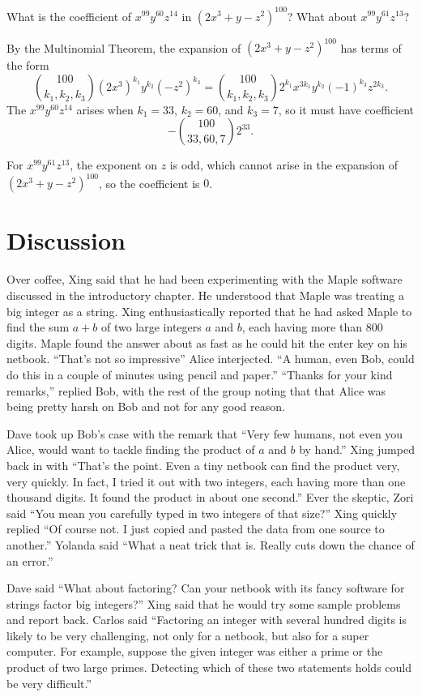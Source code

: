 \begin{example}
  What is the coefficient of $x^{99}y^{60}z^{14}$ in
  $(2x^3+y-z^2)^{100}$? What about $x^{99}y^{61}z^{13}$?

  By the Multinomial Theorem, the expansion of $(2x^3+y-z^2)^{100}$
  has terms of the form
  \[\binom{100}{k_1,k_2,k_3} (2x^3)^{k_1}y^{k_2}(-z^2)^{k_3} =
  \binom{100}{k_1,k_2,k_3} 2^{k_1}x^{3k_1}y^{k_2}(-1)^{k_3}z^{2k_3}.\]
  The $x^{99}y^{60}z^{14}$ arises when $k_1 = 33$, $k_2=60$, and
  $k_3=7$, so it must have coefficient
  \[-\binom{100}{33,60,7}2^{33}.\]

  For $x^{99}y^{61}z^{13}$, the exponent on $z$ is odd, which cannot
  arise in the expansion of $(2x^3+y-z^2)^{100}$, so the coefficient
  is $0$.
\end{example}

\section{Discussion}

Over coffee, Xing said that he had been experimenting with
the Maple software discussed in the introductory chapter.
He understood that Maple was treating a big integer as a string.
Xing enthusiastically reported that he had asked Maple to
find the sum $a+b$ of two large integers $a$ and $b$, each having more
than $800$ digits.  Maple found the answer about as fast as he
could hit the enter key on his netbook. 
``That's not so impressive'' Alice interjected.
``A human, even Bob, could do this in a couple of minutes using
pencil and paper.''  ``Thanks for your kind remarks,'' replied Bob,
with the rest of  the group noting that that Alice was being pretty
harsh on Bob and not for any good reason.

Dave took up Bob's case with the remark that ``Very few humans, not
even you Alice, would want to tackle finding the product of $a$ and
$b$ by hand.''  Xing jumped back in with ``That's the point.  Even
a tiny netbook can find the product very, very quickly.  In fact, I tried
it out with two integers, each having more than one thousand
digits.  It found the product in about one second.''  Ever the
skeptic, Zori said ``You mean you carefully typed in two
integers of that size?''  Xing quickly replied ``Of course not.  I
just copied and pasted the data from one source to another.''
Yolanda said ``What a neat trick that is.  Really cuts down the
chance of an error.''

Dave said ``What about factoring?  Can your netbook with its
fancy software for strings factor big integers?''  Xing
said that he would try some sample problems and report back.  
Carlos said  ``Factoring an integer with several hundred digits is
likely to be very challenging, not only for a netbook, but also for
a super computer.  For example, suppose the given integer was
either a prime or the product of two large primes.  Detecting
which of these two statements holds could be very difficult.''

